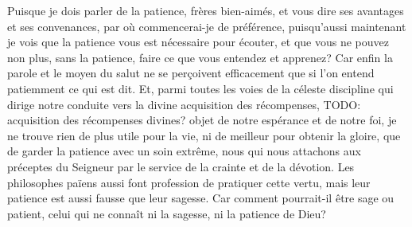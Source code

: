 Puisque je dois parler de la patience, frères bien-aimés,
	et vous dire ses avantages et ses convenances,
	par où commencerai-je de préférence,
	puisqu’aussi maintenant je vois que la patience
		vous est nécessaire pour écouter,
	et que vous ne pouvez non plus, sans la patience,
	faire ce que vous entendez et apprenez?
Car enfin la parole et le moyen du salut ne se perçoivent efficacement
	que si l’on entend patiemment ce qui est dit.
Et, parmi toutes les voies de la céleste discipline
	qui dirige notre conduite vers la divine acquisition des récompenses, TODO: acquisition des récompenses divines?
	objet de notre espérance et de notre foi,
	je ne trouve rien de plus utile pour la vie,
	ni de meilleur pour obtenir la gloire,
	que de garder la patience avec un soin extrême,
	nous qui nous attachons aux préceptes du Seigneur
		par le service de la crainte et de la dévotion.
Les philosophes païens aussi font profession de pratiquer cette vertu,
	mais leur patience est aussi fausse que leur sagesse.
Car comment pourrait-il être sage ou patient,
	celui qui ne connaît ni la sagesse, ni la patience de Dieu?
